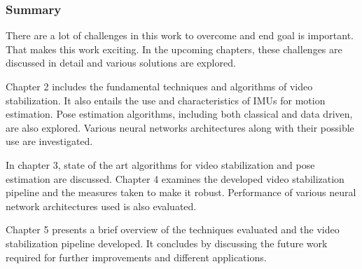 \subsubsection{Summary}
There are a lot of challenges in this work to overcome and end goal is important. That makes this work exciting. In the upcoming chapters, these challenges are discussed in detail and various solutions are explored. 

Chapter 2 includes the fundamental techniques and algorithms of video stabilization. It also entails the use and characteristics of IMUs for motion estimation. Pose estimation algorithms, including both classical and data driven, are also explored. Various neural networks architectures along with their possible use are investigated.

In chapter 3, state of the art algorithms for video stabilization and pose estimation are discussed. Chapter 4 examines the developed video stabilization pipeline and the measures taken to make it robust. Performance of various neural network architectures used is also evaluated.

Chapter 5 presents a brief overview of the techniques evaluated and the video stabilization pipeline developed. It concludes by discussing the future work required for further improvements and different applications.